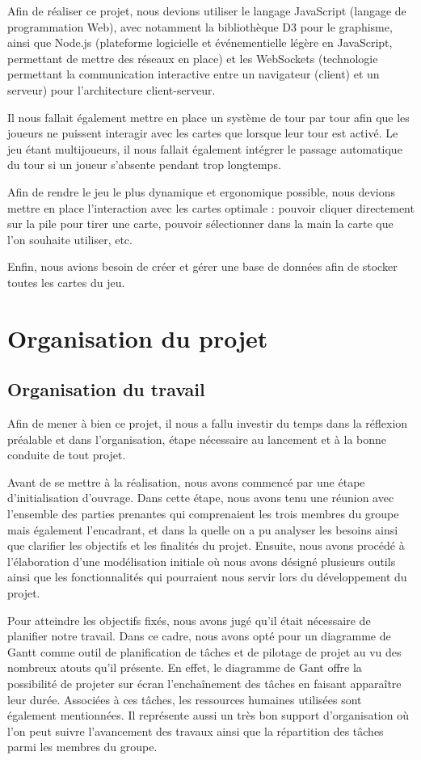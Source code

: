 \documentclass[12pt]{report}
\begin{document}
    Afin de réaliser ce projet, nous devions utiliser le langage JavaScript (langage de programmation Web), avec notamment la bibliothèque D3 pour le graphisme, ainsi que Node.js (plateforme logicielle et événementielle légère en JavaScript, permettant de mettre des réseaux en place) et les WebSockets (technologie permettant la communication interactive entre un navigateur (client) et un serveur) pour l'architecture client-serveur.


    Il nous fallait également mettre en place un système de tour par tour afin que les joueurs ne puissent interagir avec les cartes que lorsque leur tour est activé. Le jeu étant multijoueurs, il nous fallait également intégrer le passage automatique du tour si un joueur s'absente pendant trop longtemps.


    Afin de rendre le jeu le plus dynamique et ergonomique possible, nous devions mettre en place l'interaction avec les cartes optimale : pouvoir cliquer directement sur la pile pour tirer une carte, pouvoir sélectionner dans la main la carte que l'on souhaite utiliser, etc.

    Enfin, nous avions besoin de créer et gérer une base de données afin de stocker toutes les cartes du jeu.

\chapter{Organisation du projet}

    \section{Organisation du travail}
		Afin de mener à bien  ce projet, il nous a fallu investir du temps dans la réflexion préalable et dans l’organisation, étape nécessaire au lancement et  à la bonne conduite  de tout projet.

		Avant de se mettre à  la réalisation, nous avons commencé par une étape d’initialisation d’ouvrage. Dans cette étape, nous avons tenu une réunion avec l’ensemble des parties prenantes  qui comprenaient les trois membres du groupe  mais également l’encadrant, et dans la quelle on a pu analyser  les besoins ainsi que clarifier les objectifs et les finalités du projet.
		Ensuite, nous avons procédé à l’élaboration d'une modélisation initiale où nous avons désigné plusieurs outils ainsi que les fonctionnalités qui pourraient nous servir lors du  développement du projet.


		Pour atteindre les objectifs fixés,  nous avons jugé qu'il était nécessaire de planifier notre travail. Dans ce cadre,  nous avons opté pour un diagramme de Gantt comme outil de planification de tâches et de pilotage de projet au vu  des nombreux atouts qu’il présente. En effet, le diagramme de Gant offre la possibilité de projeter sur écran l’enchaînement des tâches en faisant apparaître leur durée. Associées à ces tâches, les ressources humaines utilisées sont  également mentionnées. Il représente aussi un très bon support d’organisation où l'on peut suivre l’avancement des travaux ainsi que la répartition des tâches parmi les membres du groupe.
\end{document}
